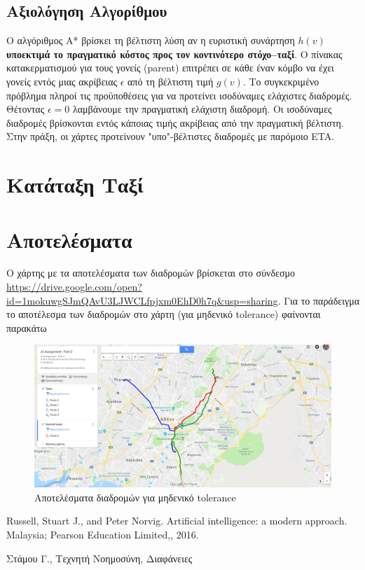\documentclass[a4paper,12pt]{article}
\begin{document}
\subsection{Αξιολόγηση Αλγορίθμου} 

Ο αλγόριθμος Α* βρίσκει τη βέλτιστη λύση αν η ευριστική συνάρτηση $h(v)$ \textbf{υποεκτιμά το πραγματικό κόστος προς τον κοντινότερο στόχο--ταξί}. Ο πίνακας κατακερματισμού για τους γονείς (parent) επιτρέπει σε κάθε έναν κόμβο να έχει γονείς εντός μιας ακρίβειας $\epsilon$ από τη βέλτιστη τιμή $g(v)$. Το συγκεκριμένο πρόβλημα πληροί τις προϋποθέσεις για να προτείνει ισοδύναμες ελάχιστες διαδρομές. Θέτοντας $\epsilon = 0$ λαμβάνουμε την πραγματική ελάχιστη διαδρομή. Οι ισοδύναμες διαδρομές βρίσκονται εντός κάποιας τιμής ακρίβειας από την πραγματική βέλτιστη. Στην πράξη, οι χάρτες προτείνουν "υπο"-βέλτιστες διαδρομές με παρόμοιο ETA. 

\section{Κατάταξη Ταξί} 

\section{Αποτελέσματα}

Ο χάρτης με τα αποτελέσματα των διαδρομών βρίσκεται στο σύνδεσμο \url{https://drive.google.com/open?id=1mokuwgSJmQAvU3LJWCLfpjxm0EhD0h7q&usp=sharing}. Για το παράδειγμα το αποτέλεσμα των διαδρομών στο χάρτη (για μηδενικό tolerance) φαίνονται παρακάτω

\begin{figure}[H]
\centering
\includegraphics[scale=0.25]{example.png}
\caption{Αποτελέσματα διαδρομών για μηδενικό tolerance}
\label{}
\end{figure}




\begin{thebibliography}{9}

 Russell, Stuart J., and Peter Norvig. Artificial intelligence: a modern approach. Malaysia; Pearson Education Limited,, 2016.

 Στάμου Γ., Τεχνητή Νοημοσύνη, Διαφάνειες

\end{thebibliography}
\end{document}
